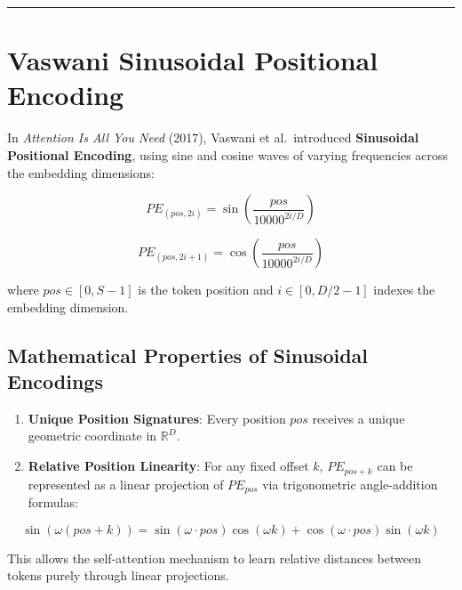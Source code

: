 \documentclass[
  letterpaper,
]{scrbook}
\providecommand{\tightlist}{%
  \setlength{\itemsep}{0pt}\setlength{\parskip}{0pt}}
\begin{document}
\begin{center}\rule{0.5\linewidth}{0.5pt}\end{center}

\section{Vaswani Sinusoidal Positional
Encoding}\label{vaswani-sinusoidal-positional-encoding}

In \emph{Attention Is All You Need} (2017), Vaswani et al.~introduced
\textbf{Sinusoidal Positional Encoding}, using sine and cosine waves of
varying frequencies across the embedding dimensions:

\[PE_{(pos, 2i)} = \sin\left(\frac{pos}{10000^{2i / D}}\right)\]

\[PE_{(pos, 2i+1)} = \cos\left(\frac{pos}{10000^{2i / D}}\right)\]

where \(pos \in [0, S-1]\) is the token position and
\(i \in [0, D/2 - 1]\) indexes the embedding dimension.

\subsection{Mathematical Properties of Sinusoidal
Encodings}\label{mathematical-properties-of-sinusoidal-encodings}

\begin{enumerate}
\def\labelenumi{\arabic{enumi}.}
\tightlist
\item
  \textbf{Unique Position Signatures}: Every position \(pos\) receives a
  unique geometric coordinate in \(\mathbb{R}^D\).
\item
  \textbf{Relative Position Linearity}: For any fixed offset \(k\),
  \(PE_{pos+k}\) can be represented as a linear projection of
  \(PE_{pos}\) via trigonometric angle-addition formulas:
\end{enumerate}

\[\sin(\omega (pos + k)) = \sin(\omega \cdot pos)\cos(\omega k) + \cos(\omega \cdot pos)\sin(\omega k)\]

This allows the self-attention mechanism to learn relative distances
between tokens purely through linear projections.
\end{document}
